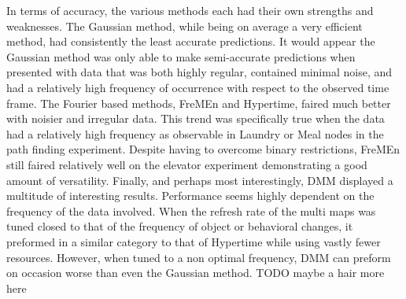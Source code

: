 In terms of accuracy, the various methods each had their own strengths and
weaknesses. The Gaussian method, while being on average a very efficient
method, had consistently the least accurate predictions. It would appear the
Gaussian method was only able to make semi-accurate predictions when presented
with data that was both highly regular, contained minimal noise, and had a
relatively high frequency of occurrence with respect to the observed time
frame. The Fourier based methods, FreMEn and Hypertime, faired much better
with noisier and irregular data. This trend was specifically true when the data
had a relatively high frequency as observable in Laundry or Meal nodes in the
path finding experiment. Despite having to overcome binary restrictions, FreMEn
still faired relatively well on the elevator experiment demonstrating a good
amount of versatility. Finally, and perhaps most interestingly, DMM
displayed a multitude of interesting results. Performance seems highly dependent
on the frequency of the data involved. When the refresh rate of the multi maps
was tuned closed to that of the frequency of object or behavioral changes, it
preformed in a similar category to that of Hypertime while using vastly fewer
resources. However, when tuned to a non optimal frequency, DMM can preform
on occasion worse than even the Gaussian method. TODO maybe a hair more here


